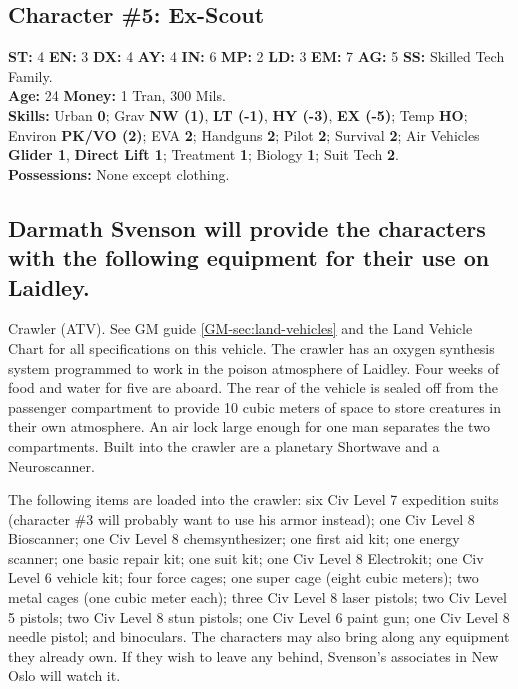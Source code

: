 \subsection{Character \#5: Ex-Scout}
\label{sec:character-5:-ex}

\textbf{ST:} 4 \textbf{EN:} 3 \textbf{DX:} 4 \textbf{AY:} 4 \textbf{IN:} 6 \textbf{MP:} 2 \textbf{LD:} 3 \textbf{EM:} 7 \textbf{AG:} 5 \textbf{SS:} Skilled Tech Family. \\
\textbf{Age:} 24 \textbf{Money:} 1 Tran, 300 Mils. \\
\textbf{Skills:} Urban \textbf{0}; Grav \textbf{NW (1)}, \textbf{LT
  (-1)}, \textbf{HY (-3)}, \textbf{EX (-5)}; Temp \textbf{HO}; Environ \textbf{PK/VO (2)}; EVA \textbf{2}; Handguns \textbf{2}; Pilot \textbf{2}; Survival \textbf{2}; 
Air Vehicles \textbf{Glider 1}, \textbf{Direct Lift 1}; Treatment \textbf{1}; Biology \textbf{1}; Suit Tech \textbf{2}. \\
\textbf{Possessions:} None except clothing. 


\subsection[Equipment]{Darmath Svenson will provide the characters
  with the 
  following equipment for their use on Laidley.}
\label{sec:darmath-svenson-will}

{\large Crawler} (ATV). See GM guide \ref{GM-sec:land-vehicles} and
the Land Vehicle Chart for all specifications on this vehicle. The
crawler has an oxygen synthesis system programmed to work in the
poison atmosphere of Laidley. Four weeks of food and water for five
are aboard. The rear of the vehicle is sealed off from the passenger
compartment to provide 10 cubic meters of space to store creatures in
their own atmosphere.  An air lock large enough for one man separates
the two compartments. Built into the crawler are a planetary Shortwave
and a Neuroscanner.

The following items are loaded into the crawler: six Civ Level 7
expedition suits (character \#3 will probably want to use his armor
instead); one Civ Level 8 Bioscanner; one Civ Level 8 chemsynthesizer;
one first aid kit; one energy scanner; one basic repair kit; one suit
kit; one Civ Level 8 Electrokit; one Civ Level 6 vehicle kit; four
force cages; one super cage (eight cubic meters); two metal cages (one
cubic meter each); three Civ Level 8 laser pistols; two Civ Level 5
pistols; two Civ Level 8 stun pistols; one Civ Level 6 paint gun; one
Civ Level 8 needle pistol; and binoculars. The characters may also
bring along any equipment they already own. If they wish to leave any
behind, Svenson's associates in New Oslo will watch it.

